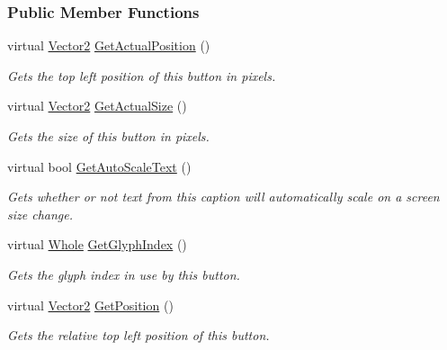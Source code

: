 \subsubsection*{Public Member Functions}
\begin{DoxyCompactItemize}
\item 
virtual \hyperlink{classMezzanine_1_1Vector2}{Vector2} \hyperlink{classMezzanine_1_1UI_1_1TextButton_a09d9245ae384209c3c108daa2a3d1b23}{GetActualPosition} ()
\begin{DoxyCompactList}\small\item\em Gets the top left position of this button in pixels. \item\end{DoxyCompactList}\item 
virtual \hyperlink{classMezzanine_1_1Vector2}{Vector2} \hyperlink{classMezzanine_1_1UI_1_1TextButton_a01a6f88cf4ee64aec91aab711ffdec6d}{GetActualSize} ()
\begin{DoxyCompactList}\small\item\em Gets the size of this button in pixels. \item\end{DoxyCompactList}\item 
virtual bool \hyperlink{classMezzanine_1_1UI_1_1TextButton_a56d50b33b0fe2bf25c420dc70bf10d1c}{GetAutoScaleText} ()
\begin{DoxyCompactList}\small\item\em Gets whether or not text from this caption will automatically scale on a screen size change. \item\end{DoxyCompactList}\item 
virtual \hyperlink{namespaceMezzanine_adcbb6ce6d1eb4379d109e51171e2e493}{Whole} \hyperlink{classMezzanine_1_1UI_1_1TextButton_ab3fc0a2d331b30364c175ba47ab83cfc}{GetGlyphIndex} ()
\begin{DoxyCompactList}\small\item\em Gets the glyph index in use by this button. \item\end{DoxyCompactList}\item 
virtual \hyperlink{classMezzanine_1_1Vector2}{Vector2} \hyperlink{classMezzanine_1_1UI_1_1TextButton_afb56b44e000d5dbf5afa09b14e2fb283}{GetPosition} ()
\begin{DoxyCompactList}\small\item\em Gets the relative top left position of this button. \item\end{DoxyCompactList}\item 

\end{DoxyCompactItemize}

